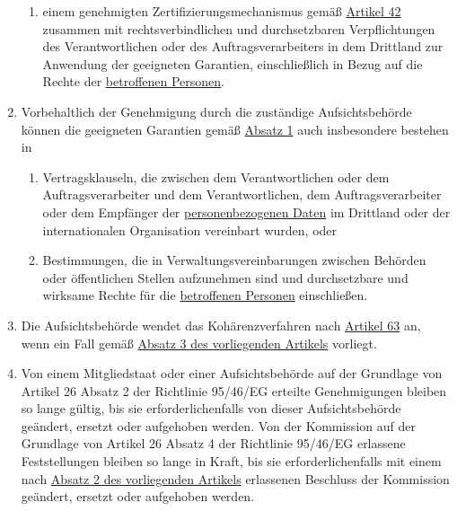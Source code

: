 \begin{enumerate}
\begin{enumerate}
    \item einem genehmigten Zertifizierungsmechanismus gemäß \hyperref[ch:42]{Artikel 42} zusammen mit
     rechtsverbindlichen und durchsetzbaren Verpflichtungen des Verantwortlichen oder des Auftragsverarbeiters in dem
     Drittland zur Anwendung der geeigneten Garantien, einschließlich in Bezug auf die Rechte der \hyperref[itm:04-1]{betroffenen
     Personen}.
    \label{itm:46-2f}

  \end{enumerate}

  \item Vorbehaltlich der Genehmigung durch die zuständige Aufsichtsbehörde können die geeigneten Garantien gemäß
   \hyperref[itm:46-1]{Absatz 1} auch insbesondere bestehen in
  \label{itm:46-3}

  \begin{enumerate}
  
    \item Vertragsklauseln, die zwischen dem Verantwortlichen oder dem Auftragsverarbeiter und dem Verantwortlichen, dem
     Auftragsverarbeiter oder dem Empfänger der \hyperref[itm:04-1]{personenbezogenen Daten} im Drittland oder der internationalen
     Organisation vereinbart wurden, oder
    \label{itm:46-3a}

    \item Bestimmungen, die in Verwaltungsvereinbarungen zwischen Behörden oder öffentlichen Stellen aufzunehmen sind
     und durchsetzbare und wirksame Rechte für die \hyperref[itm:04-1]{betroffenen Personen} einschließen.
    \label{itm:46-3b}

  \end{enumerate}

  \item Die Aufsichtsbehörde wendet das Kohärenzverfahren nach \hyperref[ch:63]{Artikel 63} an, wenn ein Fall gemäß
   \hyperref[itm:46-3]{Absatz 3 des vorliegenden Artikels} vorliegt.
  \label{itm:46-4}

  \item Von einem Mitgliedstaat oder einer Aufsichtsbehörde auf der Grundlage von Artikel 26 Absatz 2 der Richtlinie
   95/46/EG erteilte Genehmigungen bleiben so lange gültig, bis sie erforderlichenfalls von dieser
   Aufsichtsbehörde geändert, ersetzt oder aufgehoben werden. Von der Kommission auf der Grundlage von Artikel 26
   Absatz 4 der Richtlinie 95/46/EG erlassene Feststellungen bleiben so lange in Kraft, bis sie erforderlichenfalls mit
   einem nach \hyperref[itm:46-2]{Absatz 2 des vorliegenden Artikels} erlassenen Beschluss der Kommission geändert,
   ersetzt oder aufgehoben werden.
  \label{itm:46-5}

\end{enumerate}


